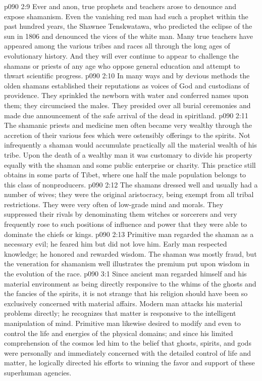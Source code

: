 \vs p090 2:9 Ever and anon, true prophets and teachers arose to denounce and expose shamanism. Even the vanishing red man had such a prophet within the past hundred years, the Shawnee Tenskwatawa, who predicted the eclipse of the sun in 1806 and denounced the vices of the white man. Many true teachers have appeared among the various tribes and races all through the long ages of evolutionary history. And they will ever continue to appear to challenge the shamans or priests of any age who oppose general education and attempt to thwart scientific progress.\plusone
\vs p090 2:10 In many ways and by devious methods the olden shamans established their reputations as voices of God and custodians of providence. They sprinkled the newborn with water and conferred names upon them; they circumcised the males. They presided over all burial ceremonies and made due announcement of the safe arrival of the dead in spiritland.
\vs p090 2:11 The shamanic priests and medicine men often became very wealthy through the accretion of their various fees which were ostensibly offerings to the spirits. Not infrequently a shaman would accumulate practically all the material wealth of his tribe. Upon the death of a wealthy man it was customary to divide his property equally with the shaman and some public enterprise or charity. This practice still obtains in some parts of Tibet, where one half the male population belongs to this class of nonproducers.
\vs p090 2:12 The shamans dressed well and usually had a number of wives; they were the original aristocracy, being exempt from all tribal restrictions. They were very often of low\hyp{}grade mind and morals. They suppressed their rivals by denominating them witches or sorcerers and very frequently rose to such positions of influence and power that they were able to dominate the chiefs or kings.
\vs p090 2:13 Primitive man regarded the shaman as a necessary evil; he feared him but did not love him. Early man respected knowledge; he honored and rewarded wisdom. The shaman was mostly fraud, but the veneration for shamanism well illustrates the premium put upon wisdom in the evolution of the race.
\vs p090 3:1 Since ancient man regarded himself and his material environment as being directly responsive to the whims of the ghosts and the fancies of the spirits, it is not strange that his religion should have been so exclusively concerned with material affairs. Modern man attacks his material problems directly; he recognizes that matter is responsive to the intelligent manipulation of mind. Primitive man likewise desired to modify and even to control the life and energies of the physical domains; and since his limited comprehension of the cosmos led him to the belief that ghosts, spirits, and gods were personally and immediately concerned with the detailed control of life and matter, he logically directed his efforts to winning the favor and support of these superhuman agencies.
